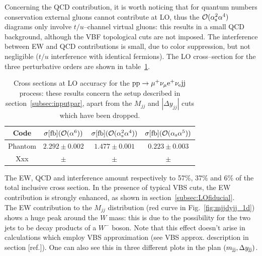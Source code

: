 Concerning the QCD contribution, it is worth noticing that for quantum numbers conservation external gluons cannot contribute at LO, thus the $\mathcal{O}(\alpha_\text{s}^2\alpha^4)$ diagrams only involve $t/u$--channel virtual gluons: this results in a small QCD background, although the VBF topological cuts are not imposed. The interference between EW and QCD contributions is small, due to color suppression, but not negligible ($t/u$ interference with identical fermions). The LO cross--section for the three perturbative orders are shown in table~\ref{tab:LOscanXsec}.
\begin{table}[h!]
    \centering
    \begin{tabular}{c|c|c|c}
        Code  &  $\sigma[\rm{fb}] (\mathcal{O}(\alpha^6))$ & $\sigma[\rm{fb}] (\mathcal{O}(\alpha_\text{s}^2\alpha^4))$ & $\sigma[\rm{fb}] (\mathcal{O}(\alpha_\text{s}\alpha^5))$ \\
        \hline
        \hline
        {\sc Phantom}  &  $ 2.292 \pm 0.002 $ & $ 1.477 \pm 0.001 $ & $ 0.223 \pm 0.003 $ \\
        {\sc Xxx}&  $ \pm $ & $ \pm $ & $ \pm $
    \end{tabular}
    \caption{\label{tab:LOscanXsec} Cross sections at LO accuracy for the ${\rm p}{\rm p}\to\mu^+\nu_\mu{\rm e}^+\nu_{\rm e}{\rm j}{\rm j}$ process: these results concern the setup described in section~\ref{subsec:inputpar}, apart from the $M_{jj}$ and $|\Delta y_{jj}|$ cuts which have been dropped.}
\end{table}
The EW, QCD and interference amount respectively to 57\%, 37\% and 6\% of the total inclusive cross section. In the presence of typical VBS cuts, the EW contribution is strongly enhanced, as shown in section~\ref{subsec:LOfiducial}.\\
The EW contribution to the $M_{jj}$ distribution (red curve in Fig.~\ref{fig:mjjdyjj_1d}) shows a huge peak around the $W$ mass: this is due to the possibility for the two jets to be decay products of a $W^-$ boson. Note that this effect doesn't arise in calculations which employ VBS approximation (see VBS approx. description in section [ref.]).
One can also see this in three different plots in the plan $\left(m_{\text{j}\text{j}}, \Delta y_{\text{j}\text{j}}\right)$.
